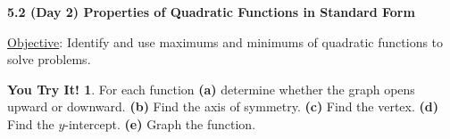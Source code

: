 \documentclass{report}
\theoremstyle{definition}
\newtheorem{youtry}{\textbf{You Try It!}}
\begin{document}
\noindent\Large{\textbf{5.2 (Day 2) Properties of Quadratic Functions in Standard Form}}\normalsize\\

\vspace{-0.5cm}

 \hfill \underline{Objective}: Identify and use maximums and minimums of quadratic functions to solve problems. \\

\vspace{-0.25cm}

\begin{youtry}
For each function \textbf{(a)} determine whether the graph opens upward or downward. \textbf{(b)} Find the axis of symmetry. \textbf{(c)} Find the vertex. \textbf{(d)} Find the $y$-intercept. \textbf{(e)} Graph the function.
\end{youtry}

\vspace{-0.5cm}
\end{document}
